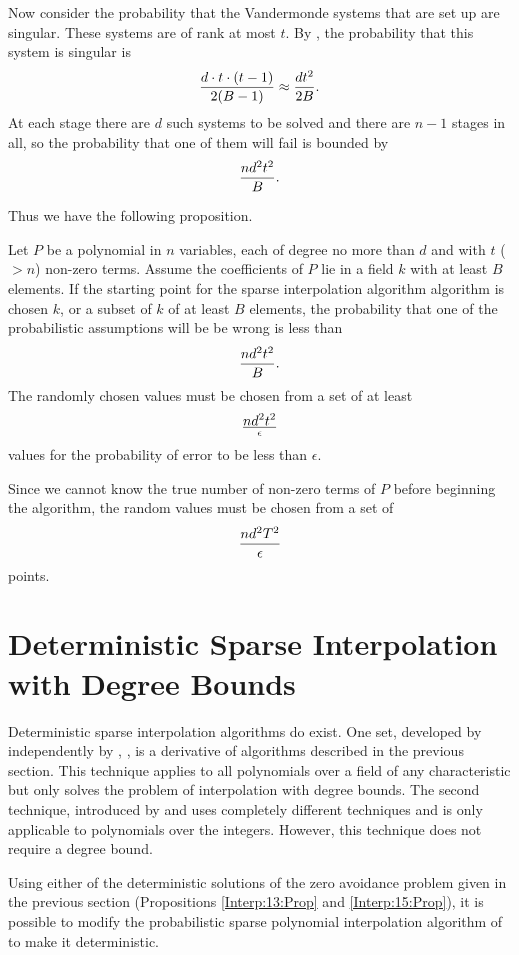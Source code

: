 \smallskip
Now consider the probability that the Vandermonde systems that are set up
are singular.  These systems are of rank at most $t$.  By
, the probability that this system is
singular is
\[
{d \cdot t \cdot (t - 1) \over 2 (B -1)} \approx {d t^2 \over 2B}.
\]
At each stage there are $d$ such systems to be solved and there are $n-1$
stages in all, so the probability that one of them will fail is bounded by
\[
{ n d^2 t^2 \over B}.
\]

Thus we have the following proposition.

\begin{proposition}
Let $P$ be a polynomial in $n$ variables, each of degree no more than $d$
and with $t$ ($> n$) non-zero terms.  Assume the coefficients of $P$ lie in
a field $k$ with at least $B$ elements.  If the starting point for the
sparse interpolation algorithm algorithm is chosen $k$, or a subset of $k$
of at least $B$ elements, the probability that one of the probabilistic
assumptions will be be wrong is less than
\[
{n d^2 t^2 \over B}.
\]
The randomly chosen values must be chosen from a set of at least
\[
n d^2 t^2 \over \epsilon
\]
values for the probability of error to be less than $\epsilon$.
\end{proposition}

Since we cannot know the true number of non-zero terms of $P$ before beginning
the algorithm, the random values must be chosen from a set of
\[
{n d^2 T^2 \over \epsilon}
\]
points.

\section{Deterministic Sparse Interpolation with Degree Bounds}
\label{Interp:ZSparse:Sec}

Deterministic sparse interpolation algorithms do exist.  One set,
developed by {\Zippel} \cite{Zippel90} independently by {\Grigoriev},
{\Karpinski}, {\Singer} \cite{Grigoriev90} is a derivative of
algorithms described in the previous section.  This technique applies
to all polynomials over a field of any characteristic but only solves
the problem of interpolation with degree bounds.  The second
technique, introduced by {\BenOr} and {\Tiwari} uses completely
different techniques and is only applicable to polynomials over the
integers.  However, this technique does not require a degree bound.

Using either of the deterministic solutions of the zero avoidance
problem given in the previous section (Propositions
\ref{Interp:13:Prop} and \ref{Interp:15:Prop}), it is possible to
modify the probabilistic sparse polynomial interpolation algorithm of
 to make it deterministic.

